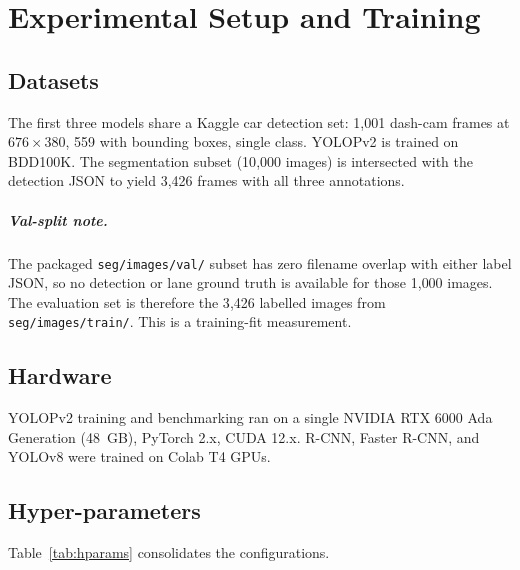 \documentclass[12pt,a4paper]{report}
\begin{document}
\chapter{Experimental Setup and Training}

\section{Datasets}

The first three models share a Kaggle car detection set: 1{,}001 dash-cam frames at $676 \times 380$, 559 with bounding boxes, single class. YOLOPv2 is trained on BDD100K. The segmentation subset (10{,}000 images) is intersected with the detection JSON to yield 3{,}426 frames with all three annotations.

\paragraph{Val-split note.} The packaged \texttt{seg/images/val/} subset has zero filename overlap with either label JSON, so no detection or lane ground truth is available for those 1{,}000 images. The evaluation set is therefore the 3{,}426 labelled images from \texttt{seg/images/train/}. This is a training-fit measurement.

\section{Hardware}

YOLOPv2 training and benchmarking ran on a single NVIDIA RTX 6000 Ada Generation (48~GB), PyTorch 2.x, CUDA 12.x. R-CNN, Faster R-CNN, and YOLOv8 were trained on Colab T4 GPUs.

\section{Hyper-parameters}

Table~\ref{tab:hparams} consolidates the configurations.
\end{document}

